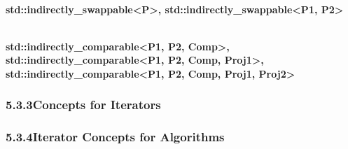 \noindent
\hspace*{\fill} \\ %
\textbf{std::indirectly\_swappable<P>, std::indirectly\_swappable<P1, P2>}


\noindent
\hspace*{\fill} \\ %
\textbf{std::indirectly\_comparable<P1, P2, Comp>, std::indirectly\_comparable<P1, P2, Comp, Proj1>, std::indirectly\_comparable<P1, P2, Comp, Proj1, Proj2>}



\subsubsection*{ 5.3.3\hspace{0.2cm}Concepts for Iterators}




\subsubsection*{ 5.3.4\hspace{0.2cm}Iterator Concepts for Algorithms}
